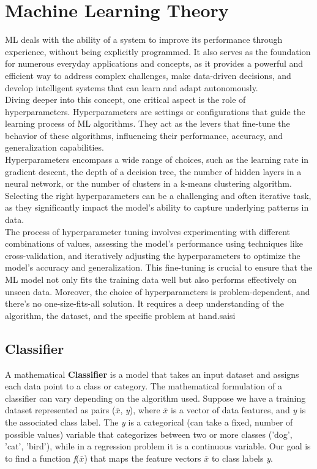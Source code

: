 \section{Machine Learning Theory}
\label{subsec:ML}

ML deals with the ability of a system to improve its performance through experience, without being explicitly programmed.
It also serves as the foundation for numerous everyday applications and concepts, 
as it provides a powerful and efficient way to address complex challenges, make data-driven decisions, 
and develop intelligent systems that can learn and adapt autonomously.\\

Diving deeper into this concept, one critical aspect is the role of hyperparameters. 
Hyperparameters are settings or configurations that guide the learning process of ML algorithms. 
They act as the levers that fine-tune the behavior of these algorithms, influencing their performance, accuracy, and generalization capabilities.\\
Hyperparameters encompass a wide range of choices, such as the learning rate in gradient descent, the depth of a decision tree, the number of hidden layers in a neural network, or the number of clusters in a k-means clustering algorithm. 
Selecting the right hyperparameters can be a challenging and often iterative task, as they significantly impact the model's ability to capture underlying patterns in data.\\
The process of hyperparameter tuning involves experimenting with different combinations of values, assessing the model's performance using techniques like cross-validation, and iteratively adjusting the hyperparameters to optimize the model's accuracy and generalization. 
This fine-tuning is crucial to ensure that the ML model not only fits the training data well but also performs effectively on unseen data.
Moreover, the choice of hyperparameters is problem-dependent, and there's no one-size-fits-all solution. 
It requires a deep understanding of the algorithm, the dataset, and the specific problem at hand.saisi

\subsection{Classifier}
\label{subsec:classifier}

A mathematical \textbf{Classifier} is a model that takes an input dataset and assigns each data point to a class or category. 
The mathematical formulation of a classifier can vary depending on the algorithm used. 
Suppose we have a training dataset represented as pairs (\textit{$\overline{x}$}, \textit{y}), where \textit{$\overline{x}$} is a vector of data features, and \textit{y} is the associated class label.
The \textit{y} is a categorical (can take a fixed, number of possible values) variable that categorizes between two or more classes ('dog', 'cat', 'bird'), while in a regression problem it is a continuous variable.
Our goal is to find a function \textit{f}(\textit{$\overline{x}$}) that maps the feature vectors \textit{$\overline{x}$} to class labels \textit{y}. \\

